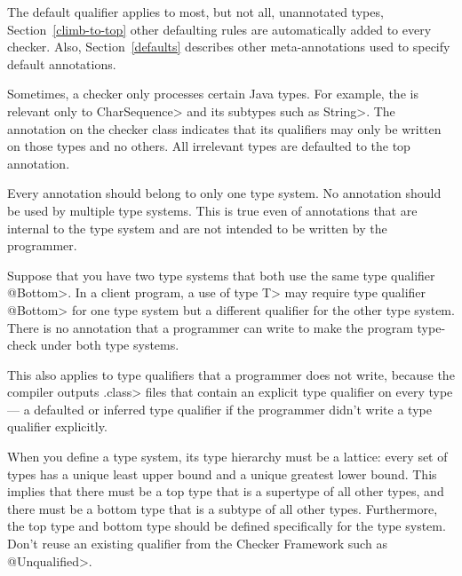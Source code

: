 The default qualifier applies to most, but not all, unannotated types, Section~\ref{climb-to-top}
other defaulting rules are automatically added to every checker. Also, Section~\ref{defaults}
describes other meta-annotations used to specify default annotations.


Sometimes, a checker only processes certain Java types.  For example, the
 is relevant only to
\<CharSequence> and its subtypes such as \<String>.
The 
annotation on the checker class indicates that its qualifiers may only be
written on those types and no others.  All irrelevant types are defaulted to
the top annotation.



Every annotation should belong to only one type system.  No annotation
should be used by multiple type systems.  This is true even of annotations
that are internal to the type system and are not intended to be written by
the programmer.

Suppose that you have two type systems that both use the same type
qualifier \<@Bottom>.  In a client program, a use of type \<T> may require type
qualifier \<@Bottom> for one type system but a different qualifier for the other
type system.  There is no annotation that a programmer can write to make
the program type-check under both type systems.

This also applies to type qualifiers that a programmer does not write,
because the compiler outputs \<.class> files that contain an explicit type
qualifier on every type --- a defaulted or inferred type qualifier if the
programmer didn't write a type qualifier explicitly.



When you define a type system, its type hierarchy must be a
lattice:  every set of types has a unique least upper bound and a unique
greatest lower bound.  This implies that there must be a top type that is a
supertype of all other types, and there must be a bottom type that is a
subtype of all other types.
Furthermore, the top type and bottom type should be defined
specifically for the type system.  Don't reuse an existing qualifier from the
Checker Framework such as \<@Unqualified>.

